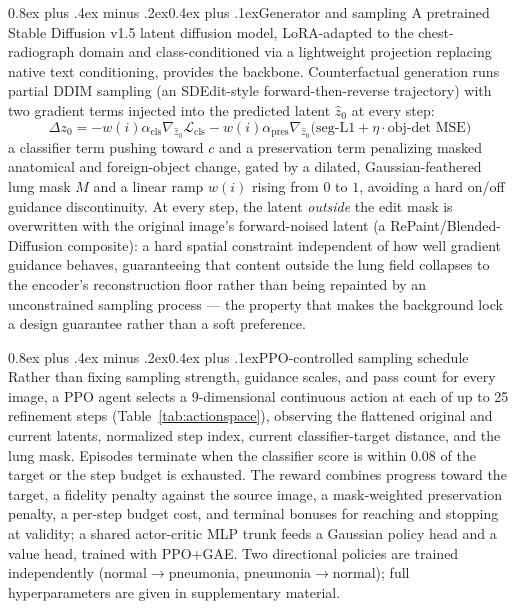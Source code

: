 \documentclass[10pt,twocolumn]{article}
\makeatletter
\renewcommand\subsection{\@startsection{subsection}{2}{\z@}%
  {0.8ex plus .4ex minus .2ex}{0.4ex plus .1ex}{\normalfont\normalsize\bfseries}}
\makeatother
\begin{document}
\subsection{Generator and sampling}
A pretrained Stable Diffusion v1.5 latent diffusion model, LoRA-adapted
to the chest-radiograph domain and class-conditioned via a lightweight
projection replacing native text conditioning, provides the backbone.
Counterfactual generation runs partial DDIM sampling (an SDEdit-style
forward-then-reverse trajectory) with two gradient terms injected into
the predicted latent $\hat z_0$ at every step:
\[
\Delta z_0 = -w(i)\alpha_{\text{cls}}\nabla_{\hat z_0}\mathcal{L}_{\text{cls}}
- w(i)\alpha_{\text{pres}}\nabla_{\hat z_0}\big(\text{seg-L1} + \eta\cdot\text{obj-det MSE}\big)
\]
a classifier term pushing toward $c$ and a preservation term penalizing
masked anatomical and foreign-object change, gated by a dilated,
Gaussian-feathered lung mask $M$ and a linear ramp $w(i)$ rising from $0$
to $1$, avoiding a hard on/off guidance discontinuity. At every step, the
latent \emph{outside} the edit mask is overwritten with the original
image's forward-noised latent (a RePaint/Blended-Diffusion composite): a
hard spatial constraint independent of how well gradient guidance
behaves, guaranteeing that content outside the lung field collapses to
the encoder's reconstruction floor rather than being repainted by an
unconstrained sampling process — the property that makes the background
lock a design guarantee rather than a soft preference.

\subsection{PPO-controlled sampling schedule}
Rather than fixing sampling strength, guidance scales, and pass count for
every image, a PPO agent selects a 9-dimensional continuous action at
each of up to 25 refinement steps (Table~\ref{tab:actionspace}), observing
the flattened original and current latents, normalized step index,
current classifier-target distance, and the lung mask. Episodes terminate
when the classifier score is within $0.08$ of the target or the step
budget is exhausted. The reward combines progress toward the target, a
fidelity penalty against the source image, a mask-weighted preservation
penalty, a per-step budget cost, and terminal bonuses for reaching and
stopping at validity; a shared actor-critic MLP trunk feeds a Gaussian
policy head and a value head, trained with PPO+GAE. Two directional
policies are trained independently (normal$\to$pneumonia,
pneumonia$\to$normal); full hyperparameters are given in supplementary
material.
\end{document}
